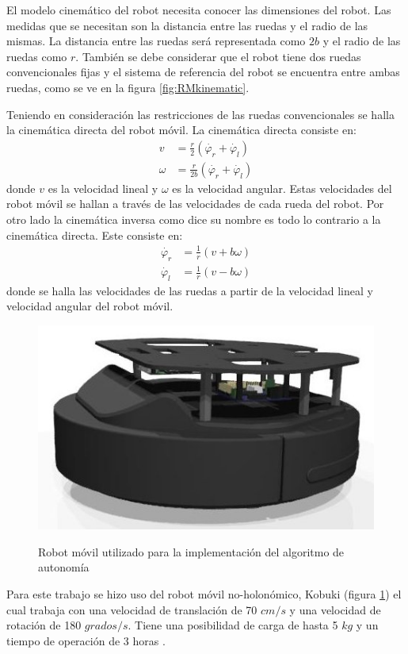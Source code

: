 El modelo cinem\'atico del robot necesita conocer las dimensiones del robot. Las 
medidas que se necesitan son la distancia entre las ruedas y el radio de las 
mismas. La distancia entre las ruedas ser\'a representada como $2b$ y el radio de 
las ruedas como $r$. Tambi\'en se debe considerar que el robot tiene dos ruedas 
convencionales fijas y el sistema de referencia del robot se encuentra entre 
ambas ruedas, como se ve en la figura \ref{fig:RMkinematic}.

Teniendo en consideración las restricciones de las ruedas convencionales se halla la 
cinemática directa del robot móvil. La cinemática directa consiste en:
\begin{align*}
v &= \frac{r}{2}(\dot{\varphi_{r}} + \dot{\varphi_{l}}) \\
\omega &= \frac{r}{2b}(\dot{\varphi_{r}} + \dot{\varphi_{l}})
\end{align*}
donde $v$ es la velocidad lineal y $\omega$ es la velocidad angular. Estas 
velocidades del robot móvil se hallan a 
través de las velocidades de cada rueda del robot. Por otro lado la cinemática inversa 
como dice su nombre es todo lo contrario a la cinemática directa. Este consiste en:
\begin{align*}
\dot{\varphi_{r}} &= \frac{1}{r}(v + b\omega) \\
\dot{\varphi_{l}} &= \frac{1}{r}(v - b\omega)
\end{align*}
donde se halla las velocidades de las ruedas a partir de la velocidad lineal y velocidad
angular del robot móvil.
\begin{figure}%
 \centering \footnotesize
 {\includegraphics[width=0.35\linewidth]{images/turtlebot.jpg}}
 \captionsetup{font=footnotesize}
 \caption{Robot m\'ovil utilizado para la implementación del algoritmo 
 de autonom\'ia}
 \label{fig:kobuki}
 \end{figure}
Para este trabajo se hizo uso del robot m\'ovil no-holon\'omico, Kobuki (figura \ref{fig:kobuki})
el cual trabaja con una velocidad de translaci\'on de 70 $cm/s$ y una velocidad de rotaci\'on 
de 180 $grados/s$. Tiene una posibilidad de carga de hasta 5 $kg$ y un tiempo de operaci\'on 
de 3 horas \cite{aboutKobuki}.

